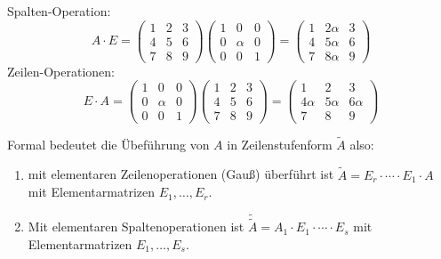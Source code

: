 \begin{enumerate}
        Spalten-Operation:
        \begin{equation*}
            A \cdot E =
            \begin{pmatrix}
                1 & 2 & 3\\
                4 & 5 & 6\\
                7 & 8 & 9
            \end{pmatrix}
            \begin{pmatrix}
                1 & 0 & 0\\
                0 & \alpha & 0\\
                0 & 0 & 1
            \end{pmatrix}
            =
            \begin{pmatrix}
                1 & 2 \alpha & 3\\
                4 & 5 \alpha & 6\\
                7 & 8 \alpha & 9
            \end{pmatrix}
        \end{equation*}
        Zeilen-Operationen:
        \begin{equation*}
            E \cdot A =
            \begin{pmatrix}
                1 & 0 & 0\\
                0 & \alpha & 0\\
                0 & 0 & 1
            \end{pmatrix}
            \begin{pmatrix}
                1 & 2 & 3\\
                4 & 5 & 6\\
                7 & 8 & 9
            \end{pmatrix}
            =
            \begin{pmatrix}
                1 & 2 & 3\\
                4 \alpha & 5 \alpha & 6 \alpha \\
                7 & 8 & 9
            \end{pmatrix}
        \end{equation*}
\end{enumerate}
Formal  bedeutet die Übeführung von $A$ in Zeilenstufenform $\tilde{A}$ also:
\begin{enumerate}[label= (\alph*)]
    \item mit elementaren Zeilenoperationen (Gauß) überführt ist
        $\tilde{A} = E_r \cdot \cdots \cdot E_1 \cdot A$ mit Elementarmatrizen
        $E_1, \ldots, E_r$.
    \item Mit elementaren Spaltenoperationen ist $\tilde{\tilde{A}} = A_1 \cdot
        E_1 \cdot \cdots \cdot E_s$ mit Elementarmatrizen $E_1, \ldots, E_s$.
\end{enumerate}

